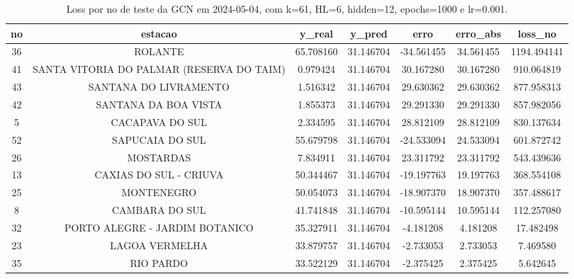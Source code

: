 \begin{table}[h]
\centering
\caption{Loss por no de teste da GCN em 2024-05-04, com k=61, HL=6, hidden=12, epochs=1000 e lr=0.001.}
\label{tab:gcn_loss_k61_hl6_h12_e1000_d20240504}
\begin{tabular}{ccccccc}
\toprule
no & estacao & y\_real & y\_pred & erro & erro\_abs & loss\_no \\
\midrule
36 & ROLANTE & 65.708160 & 31.146704 & -34.561455 & 34.561455 & 1194.494141 \\
41 & SANTA VITORIA DO PALMAR (RESERVA DO TAIM) & 0.979424 & 31.146704 & 30.167280 & 30.167280 & 910.064819 \\
43 & SANTANA DO LIVRAMENTO & 1.516342 & 31.146704 & 29.630362 & 29.630362 & 877.958313 \\
42 & SANTANA DA BOA VISTA & 1.855373 & 31.146704 & 29.291330 & 29.291330 & 857.982056 \\
5 & CACAPAVA DO SUL & 2.334595 & 31.146704 & 28.812109 & 28.812109 & 830.137634 \\
52 & SAPUCAIA DO SUL & 55.679798 & 31.146704 & -24.533094 & 24.533094 & 601.872742 \\
26 & MOSTARDAS & 7.834911 & 31.146704 & 23.311792 & 23.311792 & 543.439636 \\
13 & CAXIAS DO SUL - CRIUVA & 50.344467 & 31.146704 & -19.197763 & 19.197763 & 368.554108 \\
25 & MONTENEGRO & 50.054073 & 31.146704 & -18.907370 & 18.907370 & 357.488617 \\
8 & CAMBARA DO SUL & 41.741848 & 31.146704 & -10.595144 & 10.595144 & 112.257080 \\
32 & PORTO ALEGRE - JARDIM BOTANICO & 35.327911 & 31.146704 & -4.181208 & 4.181208 & 17.482498 \\
23 & LAGOA VERMELHA & 33.879757 & 31.146704 & -2.733053 & 2.733053 & 7.469580 \\
35 & RIO PARDO & 33.522129 & 31.146704 & -2.375425 & 2.375425 & 5.642645 \\
\bottomrule
\end{tabular}
\end{table}
